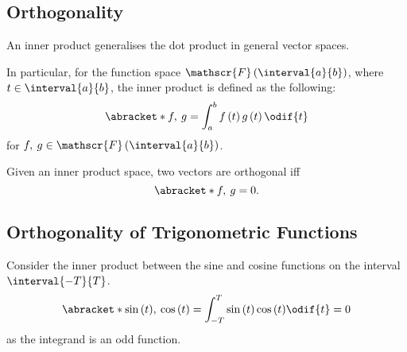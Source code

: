 \documentclass{article}
\begin{document}
\subsection{Orthogonality}
\begin{definition}
    An inner product generalises the dot product in general vector spaces.

    In particular, for the function space \(\mathscr{F}\left( \interval{a}{b} \right)\), where \(t \in \interval{a}{b}\),
    the inner product is defined as the following:
    \begin{equation*}
        \abracket*{f,\: g} = \int_a^b f\left( t \right) g\left( t \right) \odif{t}
    \end{equation*}
    for \(f,\: g \in \mathscr{F}\left( \interval{a}{b} \right)\).
\end{definition}
\begin{definition}[Orthogonality]
    Given an inner product space, two vectors are orthogonal iff
    \begin{equation*}
        \abracket*{f,\: g} = 0.
    \end{equation*}
\end{definition}
\subsection{Orthogonality of Trigonometric Functions}
Consider the inner product between the sine and cosine functions on the interval \(\interval{-T}{T}\).
\begin{equation*}
    \abracket*{\sin{\left( t \right)},\: \cos{\left( t \right)}} = \int_{-T}^T \sin{\left( t \right)} \cos{\left( t \right)} \odif{t} = 0
\end{equation*}
as the integrand is an odd function.
\end{document}
